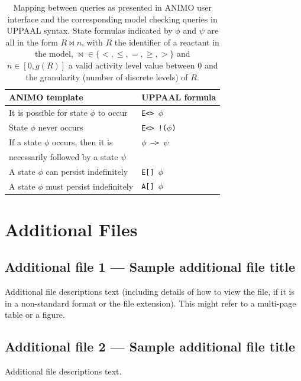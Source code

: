 \documentclass{bmcart}
\begin{document}
\begin{backmatter}
\begin{table}[h!]
\scriptsize
  \begin{center}
    \begin{tabular}{|l|l|}
      \hline
      ANIMO template & UPPAAL formula \\
      \hline
      \hline
      It is possible for state $\phi$ to occur & {\tt E<>\hspace{-1.3mm} $\phi$} \\
      \hline
      State $\phi$ never occurs & {\tt E<>\hspace{-1.3mm} !\hspace{-0.5mm}($\phi$)} \\
      \hline
      If a state $\phi$ occurs, then it is & {\tt $\phi$ --> $\psi$} \\
      necessarily followed by a state $\psi$ & \\
      \hline
      A state $\phi$ can persist indefinitely & {\tt E[]\hspace{-1.3mm} $\phi$} \\
      \hline
      A state $\phi$ must persist indefinitely & {\tt A[]\hspace{-1.3mm} $\phi$} \\
      \hline
    \end{tabular}
  \end{center}
  \caption{Mapping between queries as presented in ANIMO user interface and the corresponding
  model checking queries in UPPAAL syntax. State formulas indicated by $\phi$ and $\psi$ are all in the form
  $R \Join n$, with $R$ the identifier of a reactant in the model, $\Join \in \{<, \leq, =, \geq, >\}$
  and $n \in [0, g(R)]$ a valid activity level value between 0 and the granularity (number of discrete levels) of $R$.
  \label{tab:model-checking-templates}}
\end{table}


\section*{Additional Files}
  \subsection*{Additional file 1 --- Sample additional file title}
    Additional file descriptions text (including details of how to
    view the file, if it is in a non-standard format or the file extension).  This might
    refer to a multi-page table or a figure.

  \subsection*{Additional file 2 --- Sample additional file title}
    Additional file descriptions text.


\end{backmatter}
\end{document}
